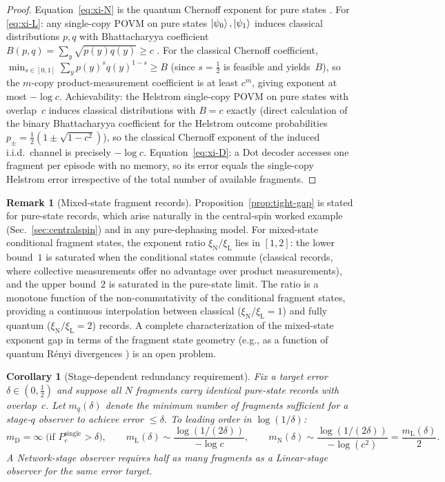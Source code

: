 \documentclass[11pt]{article}
\newcommand{\1}{\mathbf{1}}
\theoremstyle{definition}
\newtheorem{remark}{Remark}
\theoremstyle{plain}
\newtheorem{corollary}{Corollary}
\begin{document}
\begin{proof}
Equation~\eqref{eq:xi-N} is the quantum Chernoff exponent for pure
states \citep{Audenaert2007,NussbaumSzkola2009}.
For \eqref{eq:xi-L}: any single-copy POVM on pure states
$\ket{\psi_0},\ket{\psi_1}$ induces classical distributions $p,q$ with
Bhattacharyya coefficient
$B(p,q)=\sum_y\sqrt{p(y)q(y)}\ge c$
\citep{FuchsCaves1994,Jozsa1994}.
For the classical Chernoff coefficient,
$\min_{s\in[0,1]}\sum_y p(y)^s q(y)^{1-s} \ge B$ (since $s=\tfrac12$
is feasible and yields~$B$), so the $m$-copy product-measurement
coefficient is at least $c^m$, giving exponent at most $-\log c$.
Achievability: the Helstrom single-copy POVM on pure states with
overlap~$c$ induces classical distributions with $B = c$ exactly
(direct calculation of the binary Bhattacharyya coefficient for the
Helstrom outcome probabilities
$p_\pm = \tfrac{1}{2}(1\pm\sqrt{1-c^2})$), so the classical Chernoff
exponent of the induced i.i.d.\ channel is precisely $-\log c$.
Equation~\eqref{eq:xi-D}: a Dot decoder accesses one fragment per
episode with no memory, so its error equals the single-copy Helstrom
error irrespective of the total number of available fragments.
\end{proof}


\begin{remark}[Mixed-state fragment records]
\label{rem:mixed-state-gap}
Proposition~\ref{prop:tight-gap} is stated for pure-state records,
which arise naturally in the central-spin worked example
(Sec.~\ref{sec:centralspin}) and in any pure-dephasing model.
For mixed-state conditional fragment states, the exponent ratio
$\xi_{\mathrm{N}}/\xi_{\mathrm{L}}$ lies in $[1,2]$:
the lower bound~$1$ is saturated when the conditional states commute
(classical records, where collective measurements offer no advantage
over product measurements),
and the upper bound~$2$ is saturated in the pure-state limit.
The ratio is a monotone function of the non-commutativity of the
conditional fragment states, providing a continuous interpolation between
classical ($\xi_{\mathrm{N}}/\xi_{\mathrm{L}}=1$) and fully quantum
($\xi_{\mathrm{N}}/\xi_{\mathrm{L}}=2$) records.
A complete characterization of the mixed-state exponent gap in terms of
the fragment state geometry (e.g., as a function of quantum
R\'{e}nyi divergences \citep{MosonyiOgawa2015}) is an open problem.
\end{remark}


\begin{corollary}[Stage-dependent redundancy requirement]
\label{cor:redundancy-stages}
Fix a target error $\delta\in(0,\tfrac12)$ and suppose all $N$ fragments
carry identical pure-state records with overlap~$c$.
Let $m_q(\delta)$ denote the minimum number of fragments sufficient for
a stage-$q$ observer to achieve error $\le\delta$.
To leading order in $\log(1/\delta)$:
\[
  m_{\mathrm{D}}=\infty\;\text{(if $P_e^{\mathrm{single}}>\delta$)},
  \qquad
  m_{\mathrm{L}}(\delta) \sim \frac{\log(1/(2\delta))}{-\log c},
  \qquad
  m_{\mathrm{N}}(\delta) \sim \frac{\log(1/(2\delta))}{-\log(c^2)}
  = \frac{m_{\mathrm{L}}(\delta)}{2}.
\]
A Network-stage observer requires half as many fragments as a
Linear-stage observer for the same error target.
\end{corollary}
\end{document}
